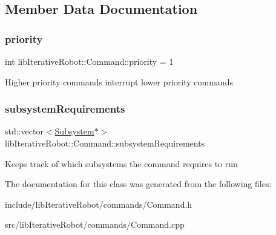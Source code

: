 \subsection{Member Data Documentation}
\mbox{\label{classlib_iterative_robot_1_1_command_af2fd312376da33f5eba582db90389511}} 
\subsubsection{\texorpdfstring{priority}{priority}}
{\footnotesize\ttfamily int lib\+Iterative\+Robot\+::\+Command\+::priority = 1\hspace{0.3cm}{\ttfamily [private]}}

Higher priority commands interrupt lower priority commands \mbox{\label{classlib_iterative_robot_1_1_command_abbedf025246921d5cde67aa954b74d35}} 
\subsubsection{\texorpdfstring{subsystemRequirements}{subsystemRequirements}}
{\footnotesize\ttfamily std\+::vector$<$\mbox{\hyperlink{classlib_iterative_robot_1_1_subsystem}{Subsystem}}$\ast$$>$ lib\+Iterative\+Robot\+::\+Command\+::subsystem\+Requirements\hspace{0.3cm}{\ttfamily [private]}}

Keeps track of which subsystems the command requires to run

 

The documentation for this class was generated from the following files\+:\begin{DoxyCompactItemize}
\item 
include/lib\+Iterative\+Robot/commands/Command.\+h\item 
src/lib\+Iterative\+Robot/commands/Command.\+cpp\end{DoxyCompactItemize}
